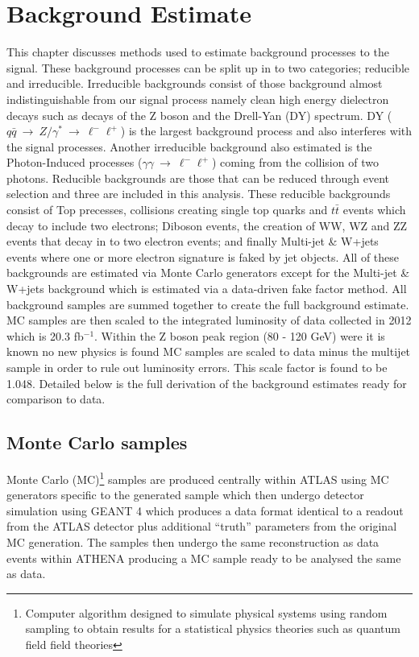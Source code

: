 \chapter{Background Estimate}

This chapter discusses methods used to estimate background processes to the signal. These background processes can be split up in to two categories; reducible and irreducible. Irreducible backgrounds consist of those background almost indistinguishable from our signal process namely clean high energy dielectron decays such as decays of the Z boson and the Drell-Yan (DY) spectrum. DY ($q\bar{q}~\rightarrow~Z/\gamma^{*}~\rightarrow~\ell^{-}\ell^{+}$) is the largest background process and also interferes with the signal processes. Another irreducible background also estimated is the Photon-Induced processes ($\gamma\gamma~\rightarrow~\ell^{-}\ell^{+}$) coming from the collision of two photons. Reducible backgrounds are those that can be reduced through event selection and three are included in this analysis. These reducible backgrounds consist of Top precesses, collisions creating single top quarks and $t\bar{t}$ events which decay to include two electrons; Diboson events, the creation of WW, WZ and ZZ events that decay in to two electron events; and finally Multi-jet \& W+jets events where one or more electron signature is faked by jet objects. All of these backgrounds are estimated via Monte Carlo generators except for the Multi-jet \& W+jets background which is estimated via a data-driven fake factor method. All background samples are summed together to create the full background estimate. MC samples are then scaled to the integrated luminosity of data collected in 2012 which is 20.3 fb$^{-1}$. Within the Z boson peak region (80 - 120 GeV) were it is known no new physics is found MC samples are scaled to data minus the multijet sample in order to rule out luminosity errors. This scale factor is found to be 1.048. Detailed below is the full derivation of the background estimates ready for comparison to data.

\section{Monte Carlo samples}
   \label{sec:MC}

   Monte Carlo (MC)\footnote{Computer algorithm designed to simulate physical systems using random sampling to obtain results for a statistical physics theories such as quantum field field theories} samples are produced centrally within ATLAS using MC generators specific to the generated sample which then undergo detector simulation using GEANT 4 \cite{Agostinelli2003250} which produces a data format identical to a readout from the ATLAS detector plus additional ``truth'' parameters from the original MC generation. The samples then undergo the same reconstruction as data events within ATHENA producing a MC sample ready to be analysed the same as data.\\



